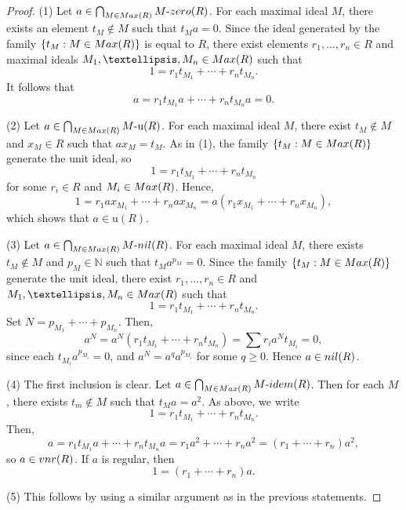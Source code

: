 \documentclass[10pt,a4paper]{amsart}
\def\Max{{\rm Max}}
\def\idem{{\rm idem}}
\def\nil{{\rm nil}}
\def\u{\mathrm{u}}
\def\vnr{{\rm vnr}}
\def\z{{zero}}
\begin{document}
\begin{proof}
(1)  Let \( a \in \bigcap_{M \in \Max(R)} M\text{-}\z(R) \). For each maximal ideal \( M \), there exists an element \( t_M \notin M \) such that \( t_M a = 0 \). Since the ideal generated by the family \( \{ t_M : M \in \Max(R) \} \) is equal to \( R \), there exist elements \( r_1, \dots, r_n \in R \) and maximal ideals \( M_1, \dots, M_n \in \Max(R) \) such that
\[
1 = r_1 t_{M_1} + \cdots + r_n t_{M_n}.
\]
It follows that
\[
a = r_1 t_{M_1} a + \cdots + r_n t_{M_n} a = 0.
\]

(2) Let \( a \in \bigcap_{M \in \Max(R)} M\text{-}\u(R) \). For each maximal ideal \( M \), there exist \( t_M \notin M \) and \( x_M \in R \) such that \( a x_M = t_M \). As in (1), the family \(\{ t_M : M \in \Max(R) \} \) generate the unit ideal, so
\[
1 = r_1 t_{M_1} + \cdots + r_n t_{M_n}
\]
for some \( r_i \in R \) and \( M_i \in \Max(R) \). Hence,
\[
1 = r_1 a x_{M_1} + \cdots + r_n a x_{M_n} = a(r_1 x_{M_1} + \cdots + r_n x_{M_n}),
\]
which shows that \( a \in \u(R) \).

(3) Let \( a \in \bigcap_{M \in \Max(R)} M\text{-}\nil(R) \). For each maximal ideal \( M \), there exists \( t_M \notin M \) and \( p_M \in \mathbb{N} \) such that \( t_M a^{p_{M}} = 0 \). Since  the family \(\{ t_M : M \in \Max(R) \} \) generate the unit ideal, there exist \( r_1, \dots, r_n \in R \) and \( M_1, \dots, M_n \in \Max(R) \) such that
\[
1 = r_1 t_{M_1} + \cdots + r_n t_{M_n}.
\]
Set \( N = p_{M_1} + \cdots + p_{M_n} \). Then,
\[
a^N = a^N (r_1 t_{M_1} + \cdots + r_n t_{M_n}) = \sum r_i a^N t_{M_i} = 0,
\]
since each \( t_{M_i} a^{p_{M_i}} = 0 \), and \( a^N = a^{q} a^{p_{M_i}} \) for some \( q \ge 0 \). Hence \( a \in \nil(R) \).

(4) The first inclusion is clear. Let \( a \in \bigcap_{M \in \Max(R)} M\text{-}\idem(R) \). Then for each \( M \), there exists \( t_m \notin M \) such that \( t_M a = a^2 \). As above, we write
\[
1 = r_1 t_{M_1} + \cdots + r_n t_{M_n}.
\]
Then,
\[
a = r_1 t_{M_1} a + \cdots + r_n t_{M_n} a = r_1 a^2 + \cdots + r_n a^2 = (r_1 + \cdots + r_n) a^2,
\]
so \( a \in \vnr(R) \). If \( a \) is regular, then
\[
1 = (r_1 + \cdots + r_n) a.
\]

(5) This follows by using a similar argument as in the previous statements.

\end{proof}
\end{document}
